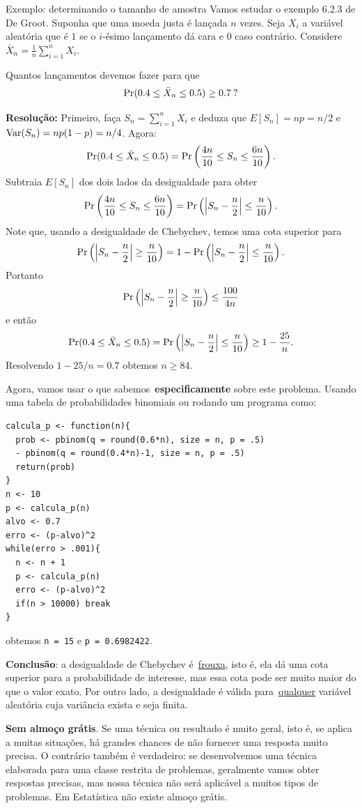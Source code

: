 \begin{frame}{Exemplo: determinando o tamanho de amostra}
Vamos estudar o exemplo 6.2.3 de De Groot.
Suponha  que uma moeda justa é lançada $n$ vezes.
Seja $X_i$ a variável aleatória que é $1$ se o $i$-ésimo lançamento dá cara e $0$ caso contrário.
Considere $\bar{X}_n = \frac{1}{n} \sum_{i=1}^n X_i$.
\begin{pergunta}
Quantos lançamentos devemos fazer para que 
$$ \operatorname{Pr}(0.4 \leq \bar{X}_n \leq 0.5) \geq 0.7\: ?$$
\end{pergunta}
\textbf{Resolução:} Primeiro, faça $S_n = \sum_{i=1}^n X_i$ e deduza que $E[S_n] = np = n/2$ e $\operatorname{Var}(S_n) = n p(1-p) = n/4$.
Agora:
$$ \operatorname{Pr}(0.4 \leq \bar{X}_n \leq 0.5) = \operatorname{Pr}\left(\frac{4n}{10} \leq S_n  \leq \frac{6n}{10} \right).$$
Subtraia $E[S_n]$ dos dois lados da desigualdade para obter
$$ \operatorname{Pr}\left(\frac{4n}{10} \leq S_n  \leq \frac{6n}{10} \right) = \operatorname{Pr} \left(\left|S_n - \frac{n}{2} \right|\leq \frac{n}{10} \right) .$$
Note que, usando a desigualdade de Chebychev, temos uma cota superior para 
$$\operatorname{Pr} \left(\left|S_n - \frac{n}{2} \right|\geq \frac{n}{10} \right) = 1 - \operatorname{Pr} \left(\left|S_n - \frac{n}{2} \right|\leq \frac{n}{10} \right).$$
Portanto
$$\operatorname{Pr} \left(\left|S_n - \frac{n}{2} \right|\geq \frac{n}{10} \right) \leq \frac{100}{4n}$$ 
e então
$$ \operatorname{Pr}(0.4 \leq \bar{X}_n \leq 0.5) = \operatorname{Pr} \left(\left|S_n - \frac{n}{2} \right|\leq \frac{n}{10} \right) \geq 1 - \frac{25}{n}.$$
Resolvendo $ 1 - 25/n = 0.7$ obtemos $n \geq 84$.

\framebreak
Agora, vamos usar o que sabemos~\textbf{especificamente} sobre este problema.
Usando uma tabela de probabilidades binomiais ou rodando um programa como:
\begin{verbatim}
calcula_p <- function(n){
  prob <- pbinom(q = round(0.6*n), size = n, p = .5) 
  - pbinom(q = round(0.4*n)-1, size = n, p = .5)
  return(prob)
}
n <- 10
p <- calcula_p(n)
alvo <- 0.7
erro <- (p-alvo)^2
while(erro > .001){
  n <- n + 1
  p <- calcula_p(n)
  erro <- (p-alvo)^2
  if(n > 10000) break
}
\end{verbatim}
obtemos \verb|n = 15| e \verb|p = 0.6982422|.

\textbf{Conclusão}: a desigualdade de Chebychev é~\underline{frouxa}, isto é, ela dá uma cota superior para a probabilidade de interesse, mas essa cota pode ser muito maior do que o valor exato.
Por outro lado, a desigualdade é válida para~\underline{qualquer} variável aleatória cuja variância exista e seja finita.

\begin{ideia}
\label{idea:no_free_lunch}
 \textbf{Sem almoço grátis}.
 Se uma técnica ou resultado é muito geral, isto é, se aplica a muitas situações, há grandes chances de não fornecer uma resposta muito precisa.
 O contrário também é verdadeiro: se desenvolvemos uma técnica elaborada para uma classe restrita de problemas, geralmente vamos obter respostas precisas, mas nossa técnica não será aplicável a muitos tipos de problemas.
 Em Estatística não existe almoço grátis.
\end{ideia}

\end{frame}
